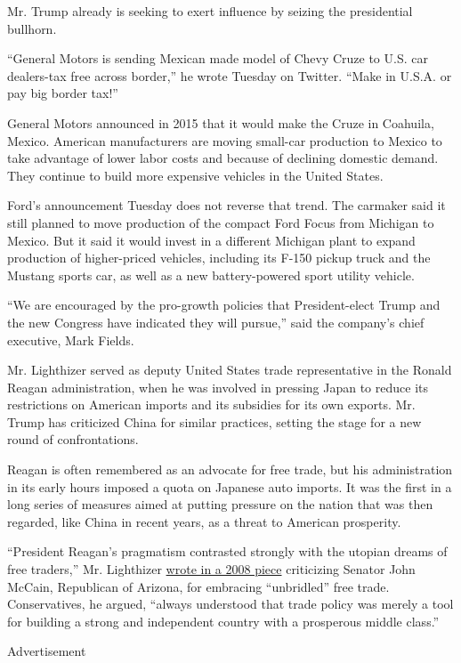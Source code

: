 Mr. Trump already is seeking to exert influence by seizing the
presidential bullhorn.

``General Motors is sending Mexican made model of Chevy Cruze to U.S.
car dealers-tax free across border,'' he wrote Tuesday on Twitter.
``Make in U.S.A. or pay big border tax!''

General Motors announced in 2015 that it would make the Cruze in
Coahuila, Mexico. American manufacturers are moving small-car production
to Mexico to take advantage of lower labor costs and because of
declining domestic demand. They continue to build more expensive
vehicles in the United States.

Ford's announcement Tuesday does not reverse that trend. The carmaker
said it still planned to move production of the compact Ford Focus from
Michigan to Mexico. But it said it would invest in a different Michigan
plant to expand production of higher-priced vehicles, including its
F-150 pickup truck and the Mustang sports car, as well as a new
battery-powered sport utility vehicle.

``We are encouraged by the pro-growth policies that President-elect
Trump and the new Congress have indicated they will pursue,'' said the
company's chief executive, Mark Fields.

Mr. Lighthizer served as deputy United States trade representative in
the Ronald Reagan administration, when he was involved in pressing Japan
to reduce its restrictions on American imports and its subsidies for its
own exports. Mr. Trump has criticized China for similar practices,
setting the stage for a new round of confrontations.

Reagan is often remembered as an advocate for free trade, but his
administration in its early hours imposed a quota on Japanese auto
imports. It was the first in a long series of measures aimed at putting
pressure on the nation that was then regarded, like China in recent
years, as a threat to American prosperity.

``President Reagan's pragmatism contrasted strongly with the utopian
dreams of free traders,'' Mr. Lighthizer
\href{http://www.nytimes.com/2008/03/06/opinion/06lighthizer.html}{wrote
in a 2008 piece} criticizing Senator John McCain, Republican of Arizona,
for embracing ``unbridled'' free trade. Conservatives, he argued,
``always understood that trade policy was merely a tool for building a
strong and independent country with a prosperous middle class.''

Advertisement


